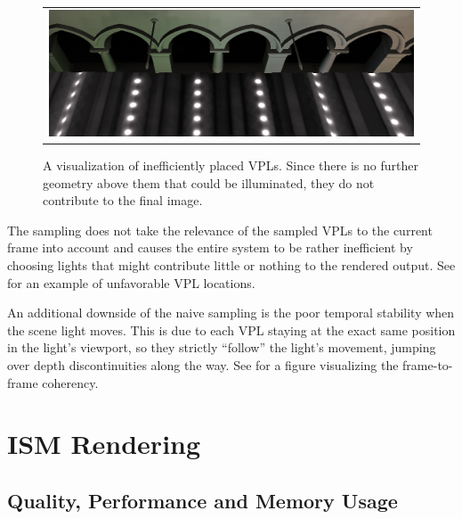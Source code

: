 \begin{figure}[htb]
\centering
  \begin{tabular}{@{}c@{}}
    \includegraphics[width=1.0\textwidth]{screenshots/RSM_unfavorable} \\
  \end{tabular}
  \caption{A visualization of inefficiently placed VPLs. Since there is no further geometry above them that could be illuminated, they do not contribute to the final image.}
  \label{fig:results:RSMUnfavorable}
\end{figure}

The sampling does not take the relevance of the sampled VPLs to the current frame into account and causes the entire system to be rather inefficient by choosing lights that might contribute little or nothing to the rendered output. See  for an example of unfavorable VPL locations.

An additional downside of the naive sampling is the poor temporal stability when the scene light moves. This is due to each VPL staying at the exact same position in the light's viewport, so they strictly ``follow'' the light's movement, jumping over depth discontinuities along the way. See  for a figure visualizing the frame-to-frame coherency.



\section{ISM Rendering}

\subsection{Quality, Performance and Memory Usage}






